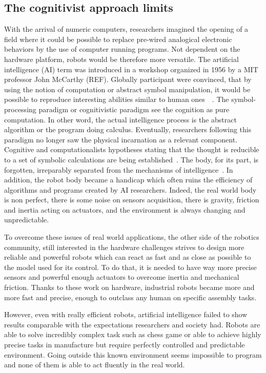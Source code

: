 \subsection{The cognitivist approach limits} %


With the arrival of numeric computers, researchers imagined the opening of a field where it could be possible to replace pre-wired analogical electronic behaviors by the use of computer running programs. Not dependent on the hardware platform, robots would be therefore more versatile.
The artificial intelligence (AI) term was introduced in a workshop organized in 1956 by a MIT professor John McCarthy (REF). Globally participant were convinced, that by using the notion of computation or abstract symbol manipulation, it would be possible to reproduce interesting abilities similar to human ones~\cite{kaufmann1979machines}~\cite{haugeland1989artificial}. The symbol-processing paradigm or cognitivistic paradigm see the cognition as pure computation. In other word, the actual intelligence process is the abstract algorithm or the program doing calculus. Eventually, researchers following this paradigm no longer saw the physical incarnation as a relevant component. Cognitive and computationalists hypotheses stating that the thought is reducible to a set of symbolic calculations are being established~\cite{fodor1987psychosemantics}. The body, for its part, is forgotten, irreparably separated from the mechanisms of intelligence~\cite{kaplan2008corps}.
In addition, the robot body became a handicap which often ruins the efficiency of algorithms and programs created by AI researchers. Indeed, the real world body is non perfect, there is some noise on sensors acquisition, there is gravity, friction and inertia acting on actuators, and the environment is always changing and unpredictable.

To overcome these issues of real world applications, the other side of the robotics community, still interested in the hardware challenges strives to design more reliable and powerful robots which can react as fast and as close as possible to the model used for its control. To do that, it is needed to have way more precise sensors and powerful enough actuators to overcome inertia and mechanical friction. Thanks to these work on hardware, industrial robots became more and more fast and precise, enough to outclass any human on specific assembly tasks.

However, even with really efficient robots, artificial intelligence failed to show results comparable with the expectations researchers and society had. Robots are able to solve incredibly complex task such as chess game or able to achieve highly precise tasks in manufacture but require perfectly controlled and predictable environment. Going outside this known environment seems impossible to program and none of them is able to act fluently in the real world.


